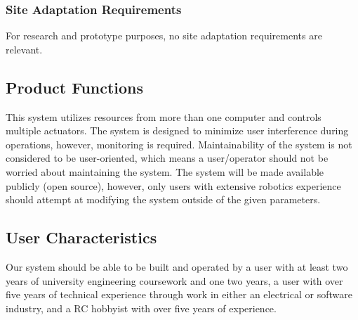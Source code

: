 \documentclass[compsoc,draftclsnofoot,onecolumn,10pt]{IEEEtran}
\begin{document}
\subsubsection{Site Adaptation Requirements}
For research and prototype purposes, no site adaptation requirements are relevant. 

\subsection{Product Functions} %
This system utilizes resources from more than one computer and controls multiple actuators. 
The system is designed to minimize user interference during operations, however, monitoring is required.
Maintainability of the system is not considered to be user-oriented, which means a user/operator should not be worried about maintaining the system. 
The system will be made available publicly (open source), however, only users with extensive robotics experience should attempt at modifying the system outside of the given parameters.


\subsection{User Characteristics} %
Our system should be able to be built and operated by a user with at least two 
years of university engineering coursework and one two years, a user with over 
five years of technical experience through work in either an electrical or software 
industry, and a RC hobbyist with over five years of experience. 
\end{document}
